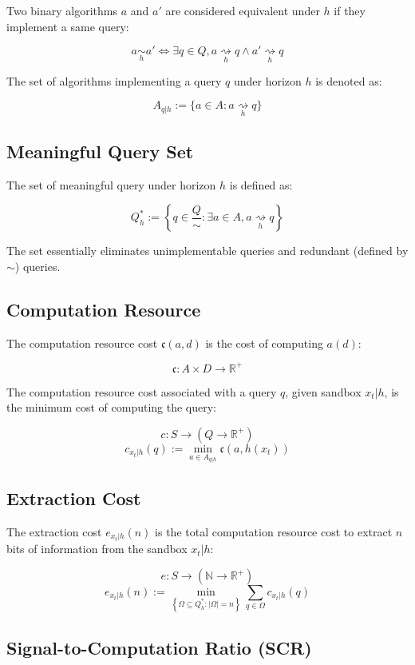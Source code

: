 \documentclass[11pt,a4paper]{article}
\theoremstyle{definition}
\theoremstyle{remark}
\numberwithin{equation}{section}
\begin{document}
Two binary algorithms $a$ and $a'$ are considered equivalent under $h$ if they implement a same query:

\[
a \underset{h}{\sim} a' \iff \exists q \in Q , a \underset{h}{\rightsquigarrow}q \wedge a' \underset{h}{\rightsquigarrow}q
\]

The set of algorithms implementing a query $q$ under horizon $h$ is denoted as:

\[
A_{q|h} := \{ a \in A : a \underset{h}{\rightsquigarrow} q \}
\]

\subsection{Meaningful Query Set}

The set of meaningful query under horizon $h$ is defined as:

\[
Q^*_h := \left\{ q \in \frac{Q}{\sim} : \exists a \in A , a \underset{h}{\rightsquigarrow} q \right\}
\]

The set essentially eliminates unimplementable queries and redundant (defined by $\sim$) queries. 
\subsection{Computation Resource}

The computation resource cost $\mathfrak{c}(a,d)$ is the cost of computing $a(d)$:

\[
\mathfrak{c} : A \times D \rightarrow \mathbb{R}^+
\]

The computation resource cost associated with a query $q$, given sandbox $x_t|h$, is the minimum cost of computing the query:

\[
c : S \rightarrow (Q \rightarrow \mathbb{R}^+)
\]
\[
c_{x_t|h}(q) := \min_{a \in A_{q|h}} \mathfrak{c}(a, h(x_t))
\]

\subsection{Extraction Cost}

The extraction cost $e_{x_t|h}(n)$ is the total computation resource cost to extract $n$ bits of information from the sandbox $x_t|h$:

\[
e : S \rightarrow (\mathbb{N} \rightarrow \mathbb{R}^+)
\]
\[
e_{x_t|h}(n) := \min_{\left\{ \Omega \subseteq Q^*_h : |\Omega| = n \right\}} \sum_{q \in \Omega} c_{x_t|h}(q)
\]

\subsection{Signal-to-Computation Ratio (SCR)}
\end{document}
